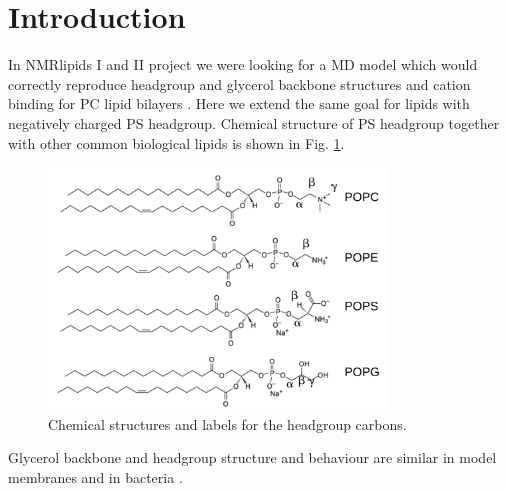 \documentclass[aps,prl,superscriptaddress,twocolumn]{revtex4}
\begin{document}
\section{Introduction}

In NMRlipids I and II project we were looking for a MD model
which would correctly reproduce headgroup and glycerol
backbone structures and cation binding for PC lipid bilayers \cite{botan15,catte16}.
Here we extend the same goal for lipids with negatively charged PS headgroup.
Chemical structure of PS headgroup together with other common biological
lipids is shown in Fig. \ref{lipids}.
\begin{figure}[]
  \centering
  \includegraphics[width=9.0cm]{../Figs/lipids.pdf}
  \caption{\label{lipids}
    Chemical structures and labels for the headgroup carbons.
  }
\end{figure}

Glycerol backbone and headgroup structure and behaviour are similar in model membranes and in bacteria \cite{gally81,scherer87,seelig90}.





\end{document}
